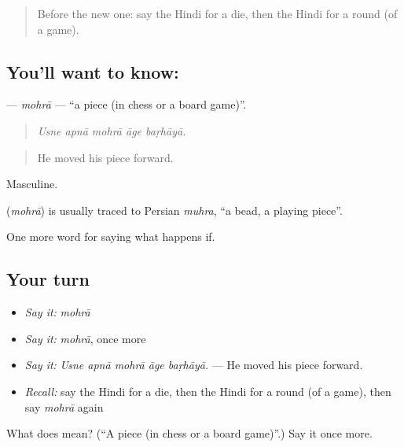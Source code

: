 \begin{quote}
Before the new one: say the Hindi for a die, then the Hindi for a round (of a game).
\end{quote}

\subsection*{You'll want to know: }
\textbf{} — \emph{mohrā} — \textquotedblleft{}a piece (in chess or a board game)\textquotedblright{}.

\begin{quote}
    
\end{quote}

\begin{quote}
\emph{Usne apnā mohrā āge baṛhāyā.}
\end{quote}

\begin{quote}
He moved his piece forward.
\end{quote}

Masculine.

\begin{cousinweb}
\textbf{} (\emph{mohrā}) is usually traced to Persian \emph{muhra}, \textquotedblleft{}a bead, a playing piece\textquotedblright{}.
\end{cousinweb}

\begin{grammarlens}[title={What you've built}]
One more word for saying what happens if.
\end{grammarlens}

\subsection*{Your turn}
\begin{itemize}
\raggedright
  \item \emph{Say it:} \emph{mohrā}
  \item \emph{Say it:} \emph{mohrā}, once more
  \item \emph{Say it:} \emph{Usne apnā mohrā āge baṛhāyā.} — He moved his piece forward.
  \item \emph{Recall:} say the Hindi for a die, then the Hindi for a round (of a game), then say \emph{mohrā} again
\end{itemize}

\begin{tcolorbox}[breakable,colback=teal!4,colframe=teal!35!black,title={Before you move on}]
What does  mean? (\textquotedblleft{}A piece (in chess or a board game)\textquotedblright{}.) Say it once more.
\end{tcolorbox}
